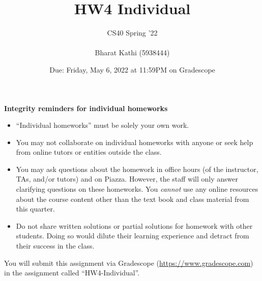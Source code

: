 \documentclass[12pt, oneside]{article}
\title{HW4 Individual}
\author{CS40 Spring '22\\\\
Bharat Kathi (5938444)}
\date{Due: Friday, May 6, 2022 at 11:59PM on Gradescope}
\begin{document}
\maketitle

{\bf Integrity reminders for individual homeworks}
\begin{itemize}
\item ``Individual homeworks'' must be solely your own work. 
\item You may not collaborate on individual homeworks with anyone or seek help from online tutors or entities outside the class.
\item You may ask questions about the homework in office hours (of the instructor, TAs, and/or tutors) and 
on Piazza.  However, the staff will only answer clarifying questions on these homeworks. You \emph{cannot} use any online resources about the course content other than the text
book and class material from this quarter.
\item Do not share written solutions or partial solutions for homework with other students. Doing so would dilute their learning experience and detract from their success in the class.
\end{itemize}

You will submit this assignment via Gradescope
(\href{https://www.gradescope.com}{https://www.gradescope.com}) in the assignment called ``HW4-Individual''.
\end{document}
